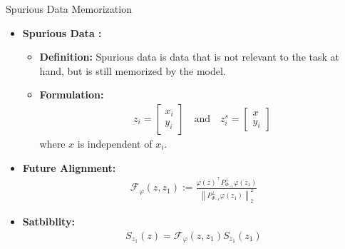 \documentclass[serif, aspectratio=169]{beamer}
\begin{document}
\begin{frame}{Spurious Data Memorization}
    \begin{itemize}
        \item \textbf{Spurious Data :}
            \begin{itemize}
                \item \textbf{Definition: }
                Spurious data is data that is not relevant to the task at hand, but is still memorized by the model.
                \item \textbf{Formulation: }
                \begin{align*}
                    z_i = \begin{bmatrix}
                        x_i \\ y_i
                    \end{bmatrix}
                    \quad \text{and} \quad
                    z_{i}^{s} = \begin{bmatrix}
                        x \\ y_i
                    \end{bmatrix}
                \end{align*}
                where $x$ is independent of $x_i$.
            \end{itemize}
            \item \textbf{Future Alignment:}
            \begin{align*}
                \mathcal{F}_\varphi(z, z_1) := \frac{\varphi(z)^\top P_{\Phi_{-1}}^\perp \varphi(z_1)}{\left\| P_{\Phi_{-1}}^\perp \varphi(z_1) \right\|_2^2}
            \end{align*}
            \item \textbf{Satbiblity:}
            \begin{align*}
                S_{z_1}(z) = \mathcal{F}_\varphi(z, z_1) S_{z_1}(z_1)
            \end{align*}
    \end{itemize}
\end{frame}
\end{document}
